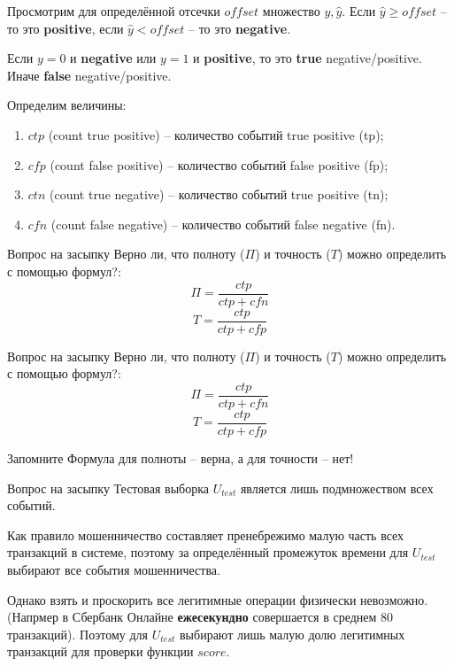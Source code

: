 \documentclass{beamer}
\newcommand{\auditorium}[1]{\color{red}{\textbf{#1}}}
\begin{document}
	\begin{frame}
	Просмотрим для определённой отсечки $offset$
	множество ${y, \hat y}$. 
	Если $\hat y \geqslant offset$ -- то это \textbf{positive}, 
	если $\hat y < offset$ -- то это \textbf{negative}.
	
	Если $y=0$ и \textbf{negative} или $y=1$ и \textbf{positive}, то это \textbf{true} negative/positive.
	Иначе \textbf{false}  negative/positive.
	
	Определим величины:
	\begin{enumerate}
		\item $ctp$ (count true positive) -- количество событий true positive (tp);
		\item $cfp$ (count false positive) -- количество событий false positive (fp);
		\item $ctn$ (count true negative) -- количество событий true positive (tn);
		\item $cfn$ (count false negative) -- количество событий false negative (fn).
	\end{enumerate}
	\end{frame}

	\begin{frame}{Вопрос на засыпку}
	Верно ли, что полноту ($\Pi$) и точность ($T$) можно определить с помощью формул?:
	\begin{equation*}
	\Pi = \frac{ctp}{ctp + cfn}
	\end{equation*}
	\begin{equation*}
	T = \frac{ctp}{ctp + cfp}
	\end{equation*}
	\auditorium{Мнение зала?}
	\end{frame}

	\begin{frame}{Вопрос на засыпку}
	Верно ли, что полноту ($\Pi$) и точность ($T$) можно определить с помощью формул?:
	\begin{equation*}
	\Pi = \frac{ctp}{ctp + cfn}
	\end{equation*}
	\begin{equation*}
	T = \frac{ctp}{ctp + cfp}
	\end{equation*}
	 \begin{block}{Запомните}
		Формула для полноты -- верна, а для точности -- нет!
	\end{block}
	\auditorium{Почему?}
	\end{frame}

	\begin{frame}{Вопрос на засыпку}
	Тестовая выборка $U_{test}$ является лишь подмножеством всех событий. 
	
	Как правило мошенничество составляет пренебрежимо малую часть всех транзакций в системе,
	поэтому за определённый промежуток времени для $U_{test}$ выбирают все события мошенничества.
	
	Однако взять и проскорить все легитимные операции физически невозможно.
	(Напрмер в Сбербанк Онлайне \textbf{ежесекундно} совершается в среднем 80 транзакций).
	Поэтому для $U_{test}$ выбирают лишь малую долю легитимных транзакций для проверки функции
	$score$.
	\end{frame}
\end{document}
